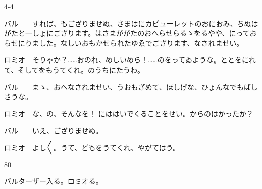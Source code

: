 \documentclass[tate,paper=b6j,jafontsize=9pt]{jlreq}
\begin{document}
\begin{azconvIndented}{4\zw}{-4\zw}

バル　　すれば、もござりませぬ、さまはにカピューレットのおにおみ、ちぬはがたと一しょにござります。はさまががたのおへらせらるゝをるやや、にっておらせにりました。なしいおもかせられたゆゑでござります、なされませい。

ロミオ　そりゃか？……おのれ、めしいめら！……のをってゐような。ととをにれて、そしてをもうてくれ。のうちにたうわ。

バル　　まゝ、おへなされませい、うおもざめて、ほしげな、ひょんなでもばしさうな。

ロミオ　な、の、そんなを！ にははいでくることをせい。からのはかったか？

バル　　いえ、ござりませぬ。

ロミオ　よし{〳〵}。うて、どもをうてくれ、やがてはう。

\end{azconvIndented}
\begin{azconvIndented}{8\zw}{0\zw}

バルターザー入る。ロミオる。

\end{azconvIndented}
\end{document}
